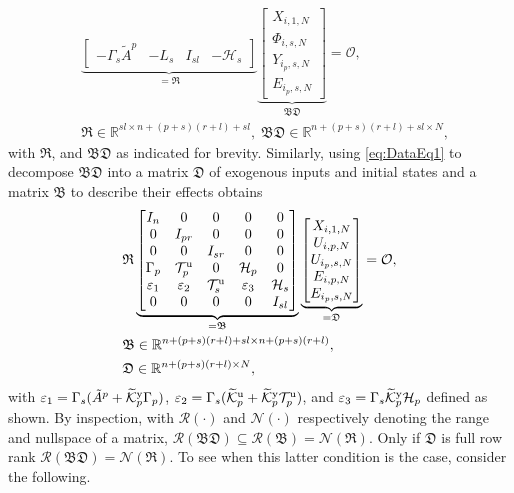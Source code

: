 \begin{align*}
    &\underbrace{\begin{bmatrix}-\Gamma_s \tilde{A}^p & -L_s & I_{sl}&-\mathcal{H}_s\end{bmatrix}}_{= \mathfrak{R}}
    \underbrace{\begin{bmatrix}
        X_{i,1,N}\\
        \Phi_{i,s,N}\\
        Y_{i_p,s,N}\\
        E_{i_p,s,N}
    \end{bmatrix}}_{\mathfrak{B}\mathfrak{D}}=\mathcal{O},\\
    &\mathfrak{R}\in\mathbb{R}^{sl\times n+(p+s)(r+l)+sl},\;\mathfrak{BD}\in\mathbb{R}^{n+(p+s)(r+l)+sl \times N},
\end{align*}
with $\mathfrak{R}$, and $\mathfrak{BD}$ as indicated for brevity. Similarly, using \eqref{eq:DataEq1} to decompose $\mathfrak{BD}$ into a matrix $\mathfrak{D}$ of exogenous inputs and initial states and a matrix $\mathfrak{B}$ to describe their effects obtains
\begin{align}
    &\mathfrak{R}
    \underbrace{\begin{bmatrix}
        I_n      & 0      & 0       & 0 & 0\\
        0        & I_{pr} & 0       & 0 & 0\\
        0        & 0      & I_{sr}  & 0 & 0\\
        \Gamma_p & \mathcal{T}_p^\mathrm{u} & 0 & \mathcal{H}_p & 0\\
        \varepsilon_1 & \varepsilon_2 & \mathcal{T}_s^\mathrm{u} & \varepsilon_3 & \mathcal{H}_s\\
        0 & 0 & 0 & 0 & I_{sl}
    \end{bmatrix}}_{=\mathfrak{B}}
    \underbrace{\begin{bmatrix}
        X_{i,1,N}\\
        U_{i,p,N}\\
        U_{i_p,s,N}\\
        E_{i,p,N}\\
        E_{i_p,s,N}
    \end{bmatrix}}_{=\mathfrak{D}}=\mathcal{O},\label{eq:RBD2}\\
    &\mathfrak{B}\in\mathbb{R}^{n+(p+s)(r+l)+sl\times n+(p+s)(r+l)},\notag\\
    &\mathfrak{D}\in\mathbb{R}^{n+(p+s)(r+l)\times N},\notag
\end{align}
with $\varepsilon_1=\Gamma_s(\tilde{A}^p+\widetilde{\mathcal{K}}_{p}^{\mathrm{{y}}}\Gamma_p)$, $\varepsilon_2=\Gamma_s(\widetilde{\mathcal{K}}_{p}^{\mathrm{{u}}}+\widetilde{\mathcal{K}}_{p}^{\mathrm{{y}}}\mathcal{T}_p^\mathrm{u})$, and $\varepsilon_3=\Gamma_s\widetilde{\mathcal{K}}_{p}^{\mathrm{{y}}}\mathcal{H}_p$ defined as shown. By inspection, with $\mathcal{R}(\cdot)$ and $\mathcal{N}(\cdot)$ respectively denoting the range and nullspace of a matrix, $\mathcal{R}(\mathfrak{B}\mathfrak{D})\subseteq\mathcal{R}(\mathfrak{B})=\mathcal{N}(\mathfrak{R})$. Only if $\mathfrak{D}$ is full row rank $\mathcal{R}(\mathfrak{B}\mathfrak{D})=\mathcal{N}(\mathfrak{R})$. To see when this latter condition is the case, consider the following.
